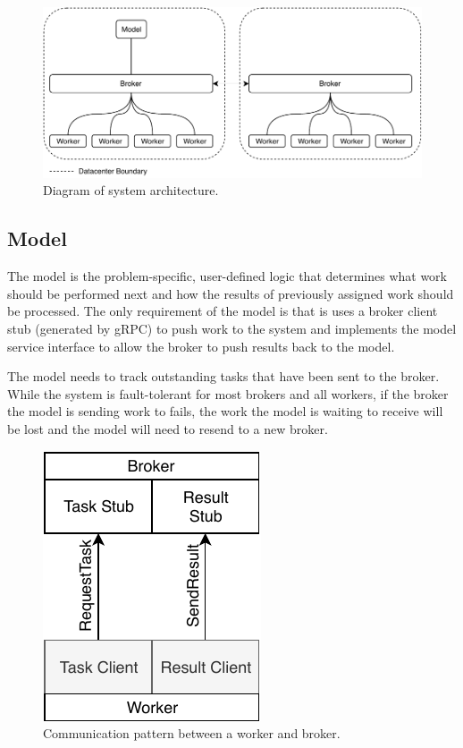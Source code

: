 \documentclass[conference]{IEEEtran}
\begin{document}
\begin{figure}
  \centering
  \includegraphics{img/broker-arch.pdf}
  \caption{Diagram of system architecture.}
  \label{fig:sys-arch}
\end{figure}

\subsection{Model}
The model is the problem-specific, user-defined logic that determines what work
should be performed next and how the results of previously assigned work should
be processed. The only requirement of the model is that is uses a broker client
stub (generated by gRPC) to push work to the system and implements the model
service interface to allow the broker to push results back to the model.

The model needs to track outstanding tasks that have been sent to the broker.
While the system is fault-tolerant for most brokers and all workers, if the
broker the model is sending work to fails, the work the model is waiting to
receive will be lost and the model will need to resend to a new broker.

\begin{figure}
  \centering
  \includegraphics{img/broker_worker}
  \caption{Communication pattern between a worker and broker.}
  \label{fig:worker-broker}
\end{figure}
\end{document}
